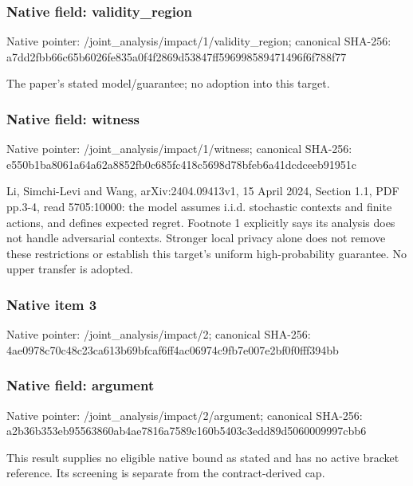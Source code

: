 \documentclass[10pt,a4paper]{article}
\begin{document}
\subsubsection{Native field: validity\_\allowbreak{}region}
Native pointer: /joint\_\allowbreak{}analysis/impact/1/validity\_\allowbreak{}region; canonical SHA-256: a7dd2fbb66c65b6026fe835a0f4f2869d53847ff596998589471496f6f788f77

\begingroup\raggedright\sloppy The paper's stated model/\allowbreak{}guarantee;\allowbreak{} no adoption into this target.\par\endgroup

\subsubsection{Native field: witness}
Native pointer: /joint\_\allowbreak{}analysis/impact/1/witness; canonical SHA-256: e550b1ba8061a64a62a8852fb0c685fc418c5698d78bfeb6a41dcdceeb91951c

\begingroup\raggedright\sloppy Li,\allowbreak{} Simchi-Levi and Wang,\allowbreak{} arXiv:\allowbreak{}2404.09413v1,\allowbreak{} 15 April 2024,\allowbreak{} Section 1.1,\allowbreak{} PDF pp.3-4,\allowbreak{} read 5705:\allowbreak{}10000:\allowbreak{} the model assumes i.i.d. stochastic contexts and finite actions,\allowbreak{} and defines expected regret. Footnote 1 explicitly says its analysis does not handle adversarial contexts. Stronger local privacy alone does not remove these restrictions or establish this target's uniform high-probability guarantee. No upper transfer is adopted.\par\endgroup

\subsubsection{Native item 3}
Native pointer: /joint\_\allowbreak{}analysis/impact/2; canonical SHA-256: 4ae0978c70c48c23ca613b69bfcaf6ff4ac06974c9fb7e007e2bf0f0fff394bb

\subsubsection{Native field: argument}
Native pointer: /joint\_\allowbreak{}analysis/impact/2/argument; canonical SHA-256: a2b36b353eb95563860ab4ae7816a7589c160b5403c3edd89d5060009997cbb6

\begingroup\raggedright\sloppy This result supplies no eligible native bound as stated and has no active bracket reference. Its screening is separate from the contract-derived cap.\par\endgroup
\end{document}
